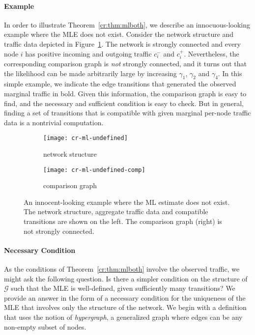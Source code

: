 \paragraph{Example}
In order to illustrate Theorem~\ref{cr:thm:mlboth}, we describe an innocuous-looking example where the MLE does not exist.
Consider the network structure and traffic data depicted in Figure~\ref{cr:fig:badexample}.
The network is strongly connected and every node $i$ has positive incoming and outgoing traffic $c^-_i$ and $c^+_i$.
Nevertheless, the corresponding comparison graph is \emph{not} strongly connected, and it turns out that the likelihood can be made arbitrarily large by increasing $\gamma_1$, $\gamma_2$ and $\gamma_4$.
In this simple example, we indicate the edge transitions that generated the observed marginal traffic in bold.
Given this information, the comparison graph is easy to find, and the necessary and sufficient condition is easy to check.
But in general, finding a set of transitions that is compatible with given marginal per-node traffic data is a nontrivial computation.

\begin{figure}
  \begin{subfigure}{.49\textwidth}
    \centering
    \texttt{[image: cr-ml-undefined]}
    \caption{network structure}
  \end{subfigure}%
  \begin{subfigure}{.49\textwidth}
    \centering
    \texttt{[image: cr-ml-undefined-comp]}
    \caption{comparison graph}
  \end{subfigure}
  \caption{An innocent-looking example where the ML estimate does not exist.
  The network structure, aggregate traffic data and compatible transitions are shown on the left.
  The comparison graph (right) is not strongly connected.}
  \label{cr:fig:badexample}
\end{figure}

\paragraph{Necessary Condition}
As the conditions of Theorem~\ref{cr:thm:mlboth} involve the observed traffic, we might ask the following question.
Is there a simpler condition on the structure of $\mathcal{G}$ such that the MLE is well-defined, given sufficiently many transitions?
We provide an answer in the form of a necessary condition for the uniqueness of the MLE that involves only the structure of the network.
We begin with a definition that uses the notion of \emph{hypergraph}, a generalized graph where edges can be any non-empty subset of nodes.

